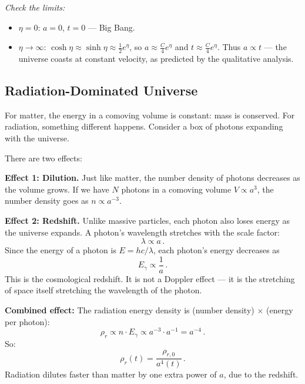 \medskip\noindent\emph{Check the limits:}
\begin{itemize}
    \item $\eta=0$: $a=0$, $t=0$ --- Big Bang.
    \item $\eta\to\infty$: $\cosh\eta\approx\sinh\eta\approx\frac{1}{2}e^\eta$, so $a\approx\frac{C}{4}e^\eta$ and $t\approx\frac{C}{4}e^\eta$. Thus $a\propto t$ --- the universe coasts at constant velocity, as predicted by the qualitative analysis.
\end{itemize}


\subsection{Radiation-Dominated Universe}

For matter, the energy in a comoving volume is constant: mass is conserved. For radiation, something different happens. Consider a box of photons expanding with the universe.

There are two effects:

\medskip\noindent\textbf{Effect 1: Dilution.} Just like matter, the number density of photons decreases as the volume grows. If we have $N$ photons in a comoving volume $V\propto a^3$, the number density goes as $n\propto a^{-3}$.

\medskip\noindent\textbf{Effect 2: Redshift.} Unlike massive particles, each photon also loses energy as the universe expands. A photon's wavelength stretches with the scale factor:
\begin{equation}
    \lambda \propto a\,.
\end{equation}
Since the energy of a photon is $E=hc/\lambda$, each photon's energy decreases as
\begin{equation}
    E_\gamma \propto \frac{1}{a}\,.
\end{equation}
This is the cosmological redshift. It is not a Doppler effect --- it is the stretching of space itself stretching the wavelength of the photon.

\medskip\noindent\textbf{Combined effect:} The radiation energy density is (number density) $\times$ (energy per photon):
\begin{equation}
    \rho_r \propto n\cdot E_\gamma \propto a^{-3}\cdot a^{-1} = a^{-4}\,.
\end{equation}
So:
\begin{equation}
\boxed{\rho_r(t) = \frac{\rho_{r,0}}{a^4(t)}\,.}
\end{equation}
Radiation dilutes faster than matter by one extra power of $a$, due to the redshift.


